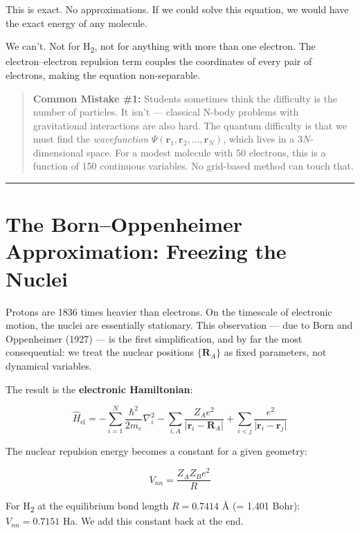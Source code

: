 \documentclass[
  11pt,
  oneside]{book}
\begin{document}
This is exact. No approximations. If we could solve this equation, we
would have the exact energy of any molecule.

We can't. Not for H\textsubscript{2}, not for anything with more than one electron. The
electron--electron repulsion term couples the coordinates of every pair
of electrons, making the equation non-separable.

\begin{quote}
\textbf{Common Mistake \#1:} Students sometimes think the difficulty is
the number of particles. It isn't --- classical N-body problems with
gravitational interactions are also hard. The quantum difficulty is that
we must find the \emph{wavefunction}
\(\Psi(\mathbf{r}_1, \mathbf{r}_2, \ldots, \mathbf{r}_N)\), which lives
in a \(3N\)-dimensional space. For a modest molecule with 50 electrons,
this is a function of 150 continuous variables. No grid-based method can
touch that.
\end{quote}

\begin{center}\rule{0.5\linewidth}{0.5pt}\end{center}

\section{The Born--Oppenheimer Approximation: Freezing the
Nuclei}\label{the-bornoppenheimer-approximation-freezing-the-nuclei}

Protons are 1836 times heavier than electrons. On the timescale of
electronic motion, the nuclei are essentially stationary. This
observation --- due to Born and Oppenheimer (1927) --- is the first
simplification, and by far the most consequential: we treat the nuclear
positions \(\{\mathbf{R}_A\}\) as fixed parameters, not dynamical
variables.

The result is the \textbf{electronic Hamiltonian}:

\[
\hat{H}_\text{el} = -\sum_{i=1}^{N} \frac{\hbar^2}{2m_e} \nabla_i^2
                     - \sum_{i,A} \frac{Z_A e^2}{\lvert\mathbf{r}_i - \mathbf{R}_A\rvert}
                     + \sum_{i<j} \frac{e^2}{\lvert\mathbf{r}_i - \mathbf{r}_j\rvert}
\]

The nuclear repulsion energy becomes a constant for a given geometry:

\[V_{nn} = \frac{Z_A Z_B e^2}{R}\]

For H\textsubscript{2} at the equilibrium bond length \(R = 0.7414\) Å (= 1.401 Bohr):
\(V_{nn} = 0.7151\) Ha. We add this constant back at the end.
\end{document}

